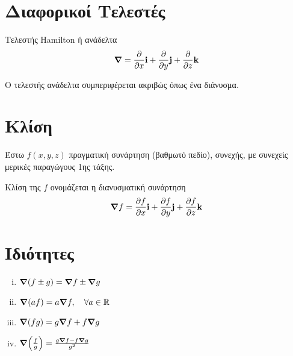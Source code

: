


\pagestyle{vangelis}
\everymath{\displaystyle}



\section{Διαφορικοί Τελεστές}

\begin{dfn}
  Τελεστής  \textcolor{Col1}{Hamilton} ή \textcolor{Col1}{ανάδελτα} 
  \[ \grad = \pdv{}{x} \mathbf{i} + \pdv{}{y} \mathbf{j} + \pdv{}{z} \mathbf{k} \]
\end{dfn}
Ο τελεστής ανάδελτα συμπεριφέρεται ακριβώς όπως ένα διάνυσμα.

\section{Κλίση}

Έστω $ f(x,y,z) $ πραγματική συνάρτηση (βαθμωτό πεδίο), συνεχής, με συνεχείς μερικές 
παραγώγους 1ης τάξης.

\begin{dfn}
  \textcolor{Col1}{Κλίση} της $f$ ονομάζεται η \textcolor{Col1}{διανυσματική} συνάρτηση
  \[
    \grad f = \pdv{f}{x} \mathbf{i} + \pdv{f}{y} \mathbf{j} + \pdv{f}{z} \mathbf{k} 
  \] 
\end{dfn}

\section{Ιδιότητες}

\begin{enumerate}[i)]
  \item $ \grad (f \pm g) = \grad f \pm \grad g $
  \item $ \grad (a f) = a \grad f, \quad \forall a \in \mathbb{R}  $
  \item $ \grad (fg) =  g \grad f +  f\grad g $
  \item $ \grad (\frac{f}{g}) = \frac{g \grad f - f \grad g}{g^{2}}  $
\end{enumerate}


